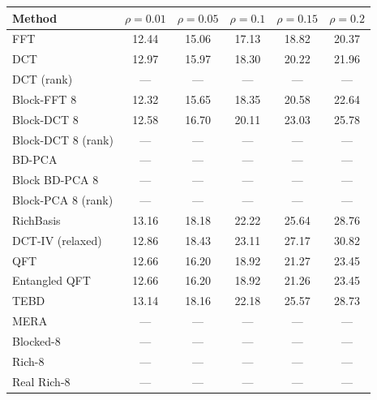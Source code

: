 %
\begin{tabular}{lccccc}
\toprule
Method & $\rho=0.01$ & $\rho=0.05$ & $\rho=0.1$ & $\rho=0.15$ & $\rho=0.2$ \\
\midrule
FFT & 12.44 & 15.06 & 17.13 & 18.82 & 20.37 \\
DCT & 12.97 & 15.97 & 18.30 & 20.22 & 21.96 \\
DCT (rank) & — & — & — & — & — \\
Block-FFT 8 & 12.32 & 15.65 & 18.35 & 20.58 & 22.64 \\
Block-DCT 8 & 12.58 & 16.70 & 20.11 & 23.03 & 25.78 \\
Block-DCT 8 (rank) & — & — & — & — & — \\
\midrule
BD-PCA & — & — & — & — & — \\
Block BD-PCA 8 & — & — & — & — & — \\
Block-PCA 8 (rank) & — & — & — & — & — \\
\midrule
RichBasis & 13.16 & 18.18 & 22.22 & 25.64 & 28.76 \\
DCT-IV (relaxed) & 12.86 & 18.43 & 23.11 & 27.17 & 30.82 \\
QFT & 12.66 & 16.20 & 18.92 & 21.27 & 23.45 \\
Entangled QFT & 12.66 & 16.20 & 18.92 & 21.26 & 23.45 \\
TEBD & 13.14 & 18.16 & 22.18 & 25.57 & 28.73 \\
MERA & — & — & — & — & — \\
\midrule
Blocked-8 & — & — & — & — & — \\
Rich-8 & — & — & — & — & — \\
Real Rich-8 & — & — & — & — & — \\
\bottomrule
\end{tabular}
